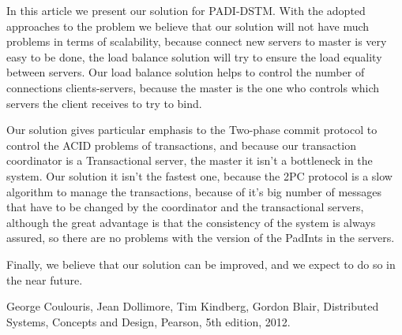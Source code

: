 \documentclass[times, 10pt,twocolumn]{article}
\begin{document}

In this article we present our solution for PADI-DSTM. With the adopted approaches to the problem we believe that our solution will not have much problems in terms of scalability, because connect new servers to master is very easy to be done, the load balance solution will try to ensure the load equality between servers. Our load balance solution helps to control the number of connections clients-servers, because the master is the one who controls which servers the client receives to try to bind.

Our solution gives particular emphasis to the Two-phase commit protocol to control the ACID problems of transactions, and because our transaction coordinator is a Transactional server, the master it isn't a bottleneck in the system. Our solution it isn't the fastest one, because the 2PC protocol is a slow algorithm to manage the transactions, because of it's big number of messages that have to be changed by the coordinator and the transactional servers, although the great advantage is that the consistency of the system is always assured, so there are no problems with the version of the PadInts in the servers. 

Finally, we believe that our solution can be improved, and we expect to do so in the near future.





\begin{thebibliography}{9}
 
George Coulouris, Jean Dollimore, Tim Kindberg, Gordon Blair,
   Distributed Systems, Concepts and Design, 
   Pearson,
   5th edition,
   2012.

\end{thebibliography}
\end{document}
